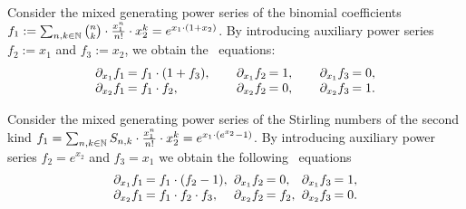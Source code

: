 \begin{example}
    \label{ex:binomial CDA}
    Consider the mixed generating power series of the binomial coefficients
    $f_1 := \sum_{n, k \in \mathbb N} {n \choose k} \cdot \frac {x_1^n} {n!} \cdot x_2^k = e^{x_1 \cdot (1 + x_2)}$.
    By introducing auxiliary power series $f_2 := x_1$ and $f_3 := x_2$,
    we obtain the \CDA~equations:
    \begin{align*}
        \arraycolsep=1pt
        \begin{array}{rl}
            \partial {x_1} f_1 &= f_1 \cdot (1 + f_3), \\
            \partial {x_2} f_1 &= f_1 \cdot f_2, \\
        \end{array}
        \qquad
        \begin{array}{rl}
            \partial {x_1} f_2 &= 1, \\
            \partial {x_2} f_2 &= 0, \\
        \end{array}
        \qquad
        \begin{array}{rl}
            \partial {x_1} f_3 &= 0, \\
            \partial {x_2} f_3 &= 1.
        \end{array}
    \end{align*}
\end{example}

\begin{example}
    \label{ex:Stirling second kind CDA}
    Consider the mixed generating power series of the Stirling numbers of the second kind
    $f_1 = \sum_{n, k \in \mathbb N} S_{n, k} \cdot \frac {x_1^n} {n!} \cdot x_2^k = e^{x_1 \cdot (e^{x_2} - 1)}$.
    By introducing auxiliary power series $f_2 = e^{x_2}$ and $f_3 = x_1$
    we obtain the following \CDA~equations
    \begin{align*}
        \arraycolsep=1pt
        \begin{array}{rl}
            \partial {x_1} f_1 &= f_1 \cdot (f_2 - 1), \\
            \partial {x_2} f_1 &= f_1 \cdot f_2 \cdot f_3, \\
        \end{array}
        \ 
        \begin{array}{rl}
            \partial {x_1} f_2 &= 0, \\
            \partial {x_2} f_2 &= f_2, \\
        \end{array}
        \ 
        \begin{array}{rl}
            \partial {x_1} f_3 &= 1, \\
            \partial {x_2} f_3 &= 0.
        \end{array}
    \end{align*}
\end{example}

